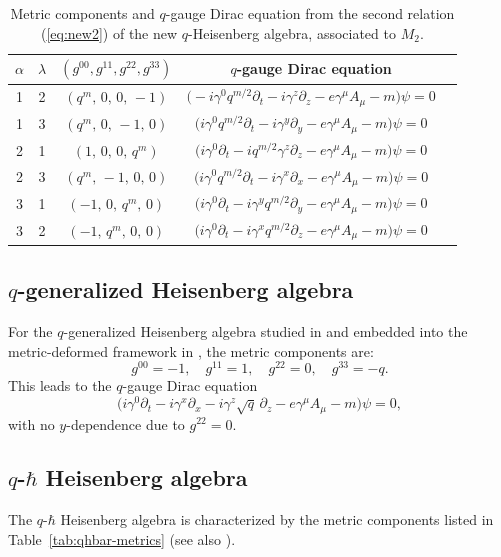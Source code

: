\documentclass[12pt,a4paper]{article}
\theoremstyle{plain}
\theoremstyle{definition}
\begin{document}
\begin{table}[H]
\centering\small
\caption{Metric components and $q$-gauge Dirac equation from the second relation (\ref{eq:new2}) of the new $q$-Heisenberg algebra, associated to $M_2$.}
\label{tab:new2-dirac-m2}
\begin{tabular}{@{}cccccc@{}}
\toprule
$\alpha$ & $\lambda$ & $(g^{00},g^{11},g^{22},g^{33})$ & \multicolumn{2}{c}{$q$-gauge Dirac equation} \\
\midrule
1 & 2 & $(q^{m},\,0,\,0,\,-1)$ & \multicolumn{2}{c}{$\bigl( -i\gamma^{0} q^{m/2}\partial_t - i\gamma^{z}\partial_z - e\gamma^{\mu}A_{\mu} - m \bigr)\psi = 0$} \\
1 & 3 & $(q^{m},\,0,\,-1,\,0)$ & \multicolumn{2}{c}{$\bigl( i\gamma^{0} q^{m/2}\partial_t - i\gamma^{y}\partial_y - e\gamma^{\mu}A_{\mu} - m \bigr)\psi = 0$} \\
2 & 1 & $(1,\,0,\,0,\,q^{m})$ & \multicolumn{2}{c}{$\bigl( i\gamma^{0}\partial_t - i q^{m/2}\gamma^{z}\partial_z - e\gamma^{\mu}A_{\mu} - m \bigr)\psi = 0$} \\
2 & 3 & $(q^{m},\,-1,\,0,\,0)$ & \multicolumn{2}{c}{$\bigl( i\gamma^{0} q^{m/2}\partial_t - i\gamma^{x}\partial_x - e\gamma^{\mu}A_{\mu} - m \bigr)\psi = 0$} \\
3 & 1 & $(-1,\,0,\,q^{m},\,0)$ & \multicolumn{2}{c}{$\bigl( i\gamma^{0}\partial_t - i\gamma^{y} q^{m/2}\partial_y - e\gamma^{\mu}A_{\mu} - m \bigr)\psi = 0$} \\
3 & 2 & $(-1,\,q^{m},\,0,\,0)$ & \multicolumn{2}{c}{$\bigl( i\gamma^{0}\partial_t - i\gamma^{x} q^{m/2}\partial_z - e\gamma^{\mu}A_{\mu} - m \bigr)\psi = 0$} \\
\bottomrule
\end{tabular}
\end{table}

\subsection{$q$-generalized Heisenberg algebra}
For the $q$-generalized Heisenberg algebra studied in \cite{Razavinia-Lopes2022} and embedded into the metric-deformed framework in \cite{Jaramillo2026a}, the metric components are:
\[
g^{00}=-1,\quad g^{11}=1,\quad g^{22}=0,\quad g^{33}=-q.
\]
This leads to the $q$-gauge Dirac equation
\[
\bigl( i\gamma^{0}\partial_t - i\gamma^{x}\partial_x - i\gamma^{z}\sqrt{q}\,\partial_z - e\gamma^{\mu}A_{\mu} - m \bigr)\psi = 0,
\]
with no $y$-dependence due to $g^{22}=0$.

\subsection{$q$-$\hbar$ Heisenberg algebra}
The $q$-$\hbar$ Heisenberg algebra \cite{Volovich-Arefeva-91} is characterized by the metric components listed in Table~\ref{tab:qhbar-metrics} (see also \cite{Jaramillo2026a}).
\end{document}
